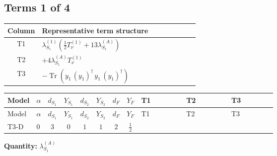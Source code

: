 \documentclass[8pt]{article}
\begin{document}
\begin{landscape}
\subsection*{Terms 1 of 4}
\begin{center}
\begin{tabular}{@{}c >{\raggedright\arraybackslash}p{0.82\linewidth}@{}}
\toprule
Column & Representative term structure \\
\midrule
T1 & \(\displaystyle {\lambda_{S_1}^{(1)}} \left(\frac{1}{2} T_{\nu}^{(1)}+13 {\lambda_{S_1}^{(A)}}\right)\) \\
\midrule
T2 & \(\displaystyle +4 {\lambda_{S_1}^{(A)}} T_{\nu}^{(1)}\) \\
\midrule
T3 & \(\displaystyle -\operatorname{Tr}\!\left({y_1}\,\left({y_1}\right)^{\dagger}\,{y_1}\,\left({y_1}\right)^{\dagger}\right)\) \\
\midrule
\bottomrule
\end{tabular}
\end{center}
\smallskip
\tiny
\begin{longtable}{@{}llcccccc >{\raggedright\arraybackslash}p{0.21\linewidth} >{\raggedright\arraybackslash}p{0.21\linewidth} >{\raggedright\arraybackslash}p{0.21\linewidth}@{}}
\toprule
Model & $\alpha$ & $d_{S_1}$ & $Y_{S_1}$ & $d_{S_2}$ & $Y_{S_2}$ & $d_F$ & $Y_F$ & T1 & T2 & T3 \\
\midrule
\endfirsthead
\toprule
Model & $\alpha$ & $d_{S_1}$ & $Y_{S_1}$ & $d_{S_2}$ & $Y_{S_2}$ & $d_F$ & $Y_F$ & T1 & T2 & T3 \\
\midrule
\endhead
T3-D & $0$ & $3$ & $0$ & $1$ & $1$ & $2$ & $\frac{1}{2}$ & \scriptsize\adjustbox{max width=\linewidth}{$\begin{gathered} {\lambda_{S_1}^{(1)}} \left(\frac{1}{2} T_{\nu}^{(1)}+13 {\lambda_{S_1}^{(A)}}\right)\end{gathered}$} & \scriptsize\adjustbox{max width=\linewidth}{$\begin{gathered} +4 {\lambda_{S_1}^{(A)}} T_{\nu}^{(1)}\end{gathered}$} & \scriptsize\adjustbox{max width=\linewidth}{$\begin{gathered} -\operatorname{Tr}\!\left({y_1}\,\left({y_1}\right)^{\dagger}\,{y_1}\,\left({y_1}\right)^{\dagger}\right)\end{gathered}$} \\
\midrule
\bottomrule
\end{longtable}
\clearpage
\noindent\textbf{Quantity: }$\lambda_{S_1}^{(A)}$\par\smallskip

\end{landscape}
\end{document}
